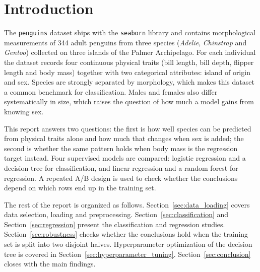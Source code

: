 \section{Introduction}
\label{sec:introduction}

The \texttt{penguins} dataset ships with the \texttt{seaborn} library and contains morphological measurements of 344 adult penguins from three species (\textit{Adelie}, \textit{Chinstrap} and \textit{Gentoo}) collected on three islands of the Palmer Archipelago. For each individual the dataset records four continuous physical traits (bill length, bill depth, flipper length and body mass) together with two categorical attributes: island of origin and sex. Species are strongly separated by morphology, which makes this dataset a common benchmark for classification. Males and females also differ systematically in size, which raises the question of how much a model gains from knowing sex.

This report answers two questions: the first is how well species can be predicted from physical traits alone and how much that changes when sex is added; the second is whether the same pattern holds when body mass is the regression target instead. Four supervised models are compared: logistic regression and a decision tree for classification, and linear regression and a random forest for regression. A repeated A/B design is used to check whether the conclusions depend on which rows end up in the training set.

The rest of the report is organized as follows. Section~\ref{sec:data_loading} covers data selection, loading and preprocessing. Section~\ref{sec:classification} and Section~\ref{sec:regression} present the classification and regression studies. Section~\ref{sec:robustness} checks whether the conclusions hold when the training set is split into two disjoint halves. Hyperparameter optimization of the decision tree is covered in Section~\ref{sec:hyperparameter_tuning}. Section~\ref{sec:conclusion} closes with the main findings.